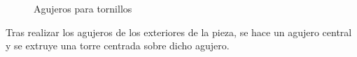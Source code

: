 \begin{figure}[H]
\centering
{}
\caption{Agujeros para tornillos }
\label{fig:agujeros_tornillos_tapa_superior}
\end{figure}

Tras realizar los agujeros de los exteriores de la pieza, se hace un agujero central y se extruye una torre centrada sobre dicho agujero.

